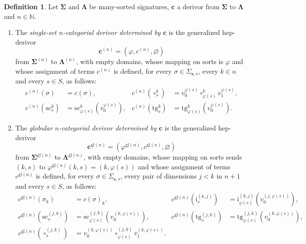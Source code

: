 \documentclass[a4paper, reqno
]{amsart}
\newcommand{\sig}[1]{\mathbf{#1}}             %
\newcommand{\gl}{\mathrm{gl}}                %
\newcommand{\src}{\mathrm{sc}}
\newcommand{\tgt}{\mathrm{tg}}
\theoremstyle{plain}
\theoremstyle{definition}
\newtheorem{definition}[theorem]{Definition}
\begin{document}
\begin{definition}\label{DChangeSigDerivor}
Let $\sig{\Sigma}$ and $\sig{\Lambda}$ be many-sorted signatures, $\mathbf{c}$ a derivor from $\sig{\Sigma}$ to $\sig{\Lambda}$ and $n\in\mathbb{N}$.
\begin{enumerate}
\item The \emph{single-set $n$-categorial derivor determined by $\mathbf{c}$} is the generalized hep-derivor
$$
\mathbf{c}^{(n)}=\left(\varphi,c^{(n)},\varnothing\right)
$$
from $\sig{\Sigma}^{(n)}$ to $\sig{\Lambda}^{(n)}$, with empty domains, whose mapping on sorts is $\varphi$ and whose assignment of terms $c^{(n)}$ is defined, for every $\sigma\in\Sigma_{\mathbf{s},s}$, every $k\in n$ and every $s\in S$, as follows:
\begin{align*}
c^{(n)}(\sigma)&=c(\sigma), &
c^{(n)}(\circ^{k}_{s})&=v^{\varphi(s)}_{0}\circ^{k}_{\varphi(s)}v^{\varphi(s)}_{1},\\
c^{(n)}(\src^{k}_{s})&=\src^{k}_{\varphi(s)}\left(v^{\varphi(s)}_{0}\right), &
c^{(n)}(\tgt^{k}_{s})&=\tgt^{k}_{\varphi(s)}\left(v^{\varphi(s)}_{0}\right).
\end{align*}
\item The \emph{globular $n$-categorial derivor determined by $\mathbf{c}$} is the generalized hep-derivor
$$
\mathbf{c}^{\gl(n)}=\left(\varphi^{\gl(n)},c^{\gl(n)},\varnothing\right)
$$
from $\sig{\Sigma}^{\gl(n)}$ to $\sig{\Lambda}^{\gl(n)}$, with empty domains, whose mapping on sorts sends $(k,s)$ to $\varphi^{\gl(n)}(k,s)=(k,\varphi(s))$ and whose assignment of terms $c^{\gl(n)}$ is defined, for every $\sigma\in\Sigma_{\mathbf{s},s}$, every pair of dimensions $j<k$ in $n+1$ and every $s\in S$, as follows:
\begin{align*}
c^{\gl(n)}(\sigma_{k})&=c(\sigma)_{k}, &
c^{\gl(n)}(\mathrm{i}^{(k,j)}_{s})&=\mathrm{i}^{(k,j)}_{\varphi(s)}\left(v^{(j,\varphi(s))}_{0}\right),\\
c^{\gl(n)}(\src^{(j,k)}_{s})&=\src^{(j,k)}_{\varphi(s)}\left(v^{(k,\varphi(s))}_{0}\right), &
c^{\gl(n)}(\tgt^{(j,k)}_{s})&=\tgt^{(j,k)}_{\varphi(s)}\left(v^{(k,\varphi(s))}_{0}\right),\\
c^{\gl(n)}(\circ^{(j,k)}_{s})&=v^{(k,\varphi(s))}_{0}\circ^{(j,k)}_{\varphi(s)}v^{(k,\varphi(s))}_{1}.
\end{align*}
\end{enumerate}
\end{definition}
\end{document}
